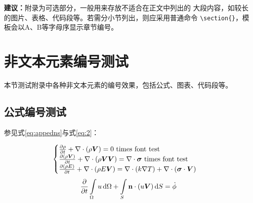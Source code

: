 \begin{appendices}\label{sec:appendices}

    \begin{leftbar}
        \noindent\textbf{建议：}附录为可选部分，一般用来存放不适合在正文中列出的
        大段内容，如较长的图片、表格、代码段等。若需分小节列出，则应采用普通命令
        \verb|\section{}|，模板会以A、B等字母序显示章节编号。
    \end{leftbar}

    \section{非文本元素编号测试} \label{sec:nontextelements}

    本节测试附录中各种非文本元素的编号效果，包括公式、图表、代码段等。

    \subsection{公式编号测试} \label{subsec:testmath}

    参见式\eqref{eq:appedns}与式\eqref{eq:2}：

    \begin{equation} \label{eq:appedns}
        \begin{cases}
            \frac{\partial \rho}{\partial t} + \nabla\cdot(\rho\Vector{V}) = 0 \ \mathrm{times\ font\ test}                                            \\
            \frac{\partial (\rho\Vector{V})}{\partial t} + \nabla\cdot(\rho\Vector{V}\Vector{V}) = \nabla\cdot\Tensor{\sigma} \ \text{times font test} \\
            \frac{\partial (\rho E)}{\partial t} + \nabla\cdot(\rho E\Vector{V}) = \nabla\cdot(k\nabla T) + \nabla\cdot(\Tensor{\sigma}\cdot\Vector{V})
        \end{cases}
    \end{equation}
    \begin{equation} \label{eq:2}
        \frac{\partial }{\partial t}\int\limits_{\Omega} u \, \mathrm{d}\Omega + \int\limits_{S} \boldsymbol{\mathbf{n}}\cdot(u\boldsymbol{V}) \, \mathrm{d}S = \dot{\phi}
    \end{equation}


\end{appendices}
